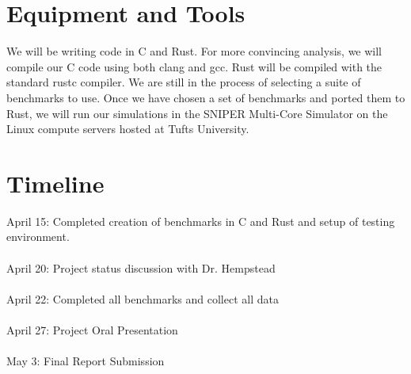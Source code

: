 \documentclass{article}
\begin{document}
\section*{Equipment and Tools}

We will be writing code in C and Rust. For more convincing analysis, we will compile our C code using both clang and gcc. Rust will be compiled with the standard rustc compiler. We are still in the process of selecting a suite of benchmarks to use. Once we have chosen a set of benchmarks and ported them to Rust, we will run our simulations in the SNIPER Multi-Core Simulator \cite{Sniper} on the Linux compute servers hosted at Tufts University.


\section*{Timeline}

April 15: Completed creation of benchmarks in C and Rust and setup of testing environment.
\\\\
April 20: Project status discussion with Dr. Hempstead 
\\\\
April 22: Completed all benchmarks and collect all data
\\\\
April 27: Project Oral Presentation
\\\\
May 3:  Final Report Submission





\end{document}
